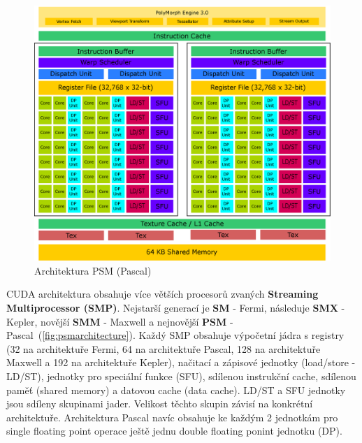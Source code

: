 \begin{figure}[h]
\centering
  \includegraphics[width=1.0\linewidth]{img/PSMArchitecture.eps}
  \caption{Architektura PSM (Pascal)}
  \label{fig:psmarchitecture}
\end{figure}

CUDA architektura obsahuje více větších procesorů zvaných \textbf{Streaming Multiprocessor (SMP)}. Nejstarší generací je \textbf{SM} - Fermi, následuje \textbf{SMX} - Kepler, novější \textbf{SMM} - Maxwell a nejnovější \textbf{PSM} - Pascal~(\autoref{fig:psmarchitecture}). Každý SMP obsahuje výpočetní jádra s registry (32 na architektuře Fermi, 64 na architektuře Pascal, 128 na architektuře Maxwell a 192 na architektuře Kepler), načitací a zápisové jednotky (load/store - LD/ST), jednotky pro speciální funkce (SFU), sdílenou instrukční cache, sdílenou paměť (shared memory) a datovou cache (data cache). LD/ST a SFU jednotky jsou sdíleny skupinami jader. Velikost těchto skupin závisí na konkrétní architektuře. Architektura Pascal navíc obsahuje ke každým 2 jednotkám pro single floating point operace ještě jednu double floating ponint jednotku (DP).\\

